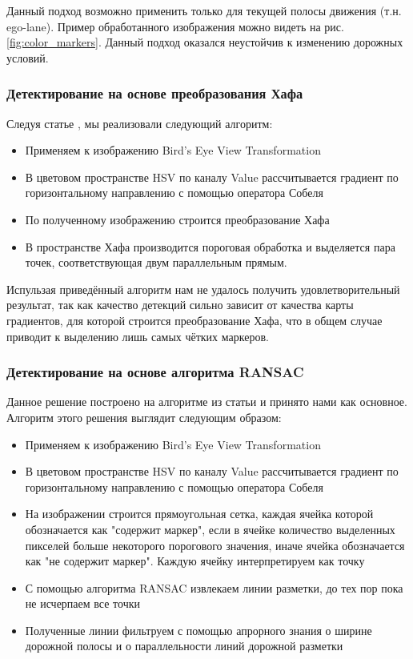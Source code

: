 \documentclass[aps,%
14pt,%
final,%
oneside,
onecolumn,%
musixtex, %
superscriptaddress,%
centertags]{extarticle} %
\begin{document}
Данный подход возможно применить только для текущей полосы движения (т.н. ego-lane). Пример обработанного изображения можно видеть на рис. \ref{fig:color_markers}. Данный подход оказался неустойчив к изменению дорожных условий.

\subsubsection*{Детектирование на основе преобразования Хафа}
Следуя статье \cite{song2017real}, мы реализовали следующий алгоритм:
\begin{itemize}
    \item Применяем к изображению Bird's Eye View Transformation
    \item В цветовом пространстве HSV по каналу Value рассчитывается градиент по горизонтальному направлению с помощью оператора Собеля
    \item По полученному изображению строится преобразование Хафа
    \item В пространстве Хафа производится пороговая обработка и выделяется пара точек, соответствующая двум параллельным прямым.
\end{itemize}

Испульзая приведённый алгоритм нам не удалось получить удовлетворительный результат, так как качество детекций сильно зависит от качества карты градиентов, для которой строится преобразование Хафа, что в общем случае приводит к выделению лишь самых чётких маркеров.

\subsubsection*{Детектирование на основе алгоритма RANSAC}
Данное решение построено на алгоритме из статьи \cite{aly2008real} и принято нами как основное. Алгоритм этого решения выглядит следующим образом:
\begin{itemize}
    \item Применяем к изображению Bird's Eye View Transformation
    \item В цветовом пространстве HSV по каналу Value рассчитывается градиент по горизонтальному направлению с помощью оператора Собеля
    \item На изображении строится прямоугольная сетка, каждая ячейка которой обозначается как "содержит маркер", если в ячейке количество выделенных пикселей больше некоторого порогового значения, иначе ячейка обозначается как "не содержит маркер". Каждую ячейку интерпретируем как точку
    \item С помощью алгоритма RANSAC извлекаем линии разметки, до тех пор пока не исчерпаем все точки
    \item Полученные линии фильтруем с помощью апрорного знания о ширине дорожной полосы и о параллельности линий дорожной разметки
\end{itemize}
\end{document}
